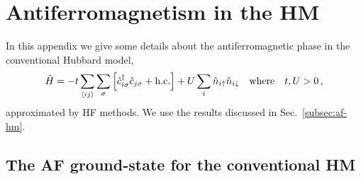 \chapter{Antiferromagnetism in the HM}\label{app:hm-af-ground-state}

In this appendix we give some details about the antiferromagnetic phase in the conventional Hubbard model,
\begin{equation}\label{appeq:hm}
	\hat H = 
	-t \sum_{\langle ij \rangle} \sum_\sigma \left[
	\hat c_{i\sigma}^\dagger \hat c_{j\sigma} + \hc
	\right]
	+ U \sum_i \hat n_{i\uparrow} \hat n_{i\downarrow}
	\qq{where}
	t, U  > 0 \, ,
\end{equation}
approximated by HF methods. We use the results discussed in Sec.~\ref{subsec:af-hm}.

\section{The AF ground-state for the conventional HM}

